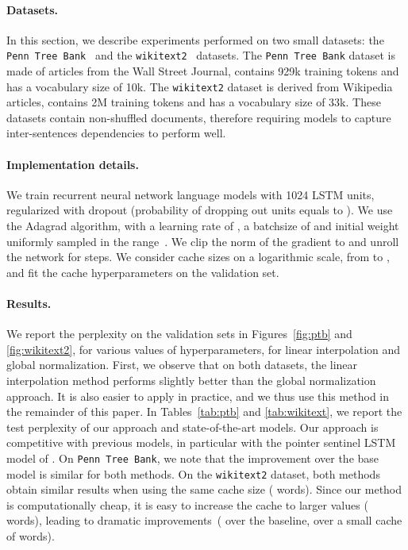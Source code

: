\documentclass{article} \usepackage{iclr2017_conference,times}
\begin{document}
\paragraph{Datasets.} In this section, we describe experiments performed on two small datasets: the \texttt{Penn Tree Bank}~\citep{marcus1993building} and the \texttt{wikitext2}~\citep{merity2016pointer} datasets.
The \texttt{Penn Tree Bank} dataset is made of articles from the Wall Street Journal, contains 929k training tokens and has a vocabulary size of 10k.
The \texttt{wikitext2} dataset is derived from Wikipedia articles, contains 2M training tokens and has a vocabulary size of 33k.
These datasets contain non-shuffled documents, therefore requiring models to capture inter-sentences dependencies to perform well.

\paragraph{Implementation details.} We train recurrent neural network language models with 1024 LSTM units, regularized with dropout (probability of dropping out units equals to ).
We use the Adagrad algorithm, with a learning rate of , a batchsize of  and initial weight uniformly sampled in the range~.
We clip the norm of the gradient to  and unroll the network for  steps.
We consider cache sizes on a logarithmic scale, from  to , and fit the cache hyperparameters on the validation set.

\paragraph{Results.} We report the perplexity on the validation sets in Figures~\ref{fig:ptb} and \ref{fig:wikitext2}, for various values of hyperparameters, for linear interpolation and global normalization.
First, we observe that on both datasets, the linear interpolation method performs slightly better than the global normalization approach.
It is also easier to apply in practice, and we thus use this method in the remainder of this paper.
In Tables~\ref{tab:ptb} and \ref{tab:wikitext}, we report the test perplexity of our approach and state-of-the-art models.
Our approach is competitive with previous models, in particular with the pointer sentinel LSTM model of \citet{merity2016pointer}.
On \texttt{Penn Tree Bank}, we note that the improvement over the base model is similar for both methods.
On the \texttt{wikitext2} dataset, both methods obtain similar results when using the same cache size ( words).
Since our method is computationally cheap, it is easy to increase the cache to larger values ( words), leading to dramatic improvements~( over the baseline,  over a small cache of  words).
\end{document}

